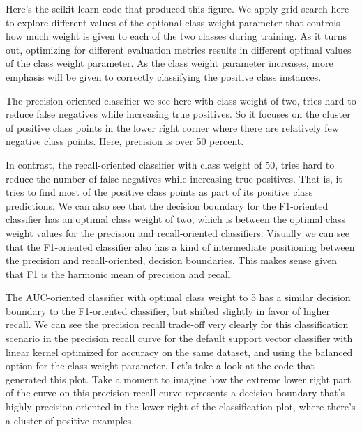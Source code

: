 \begin{multicols}{2}
Here's the scikit-learn code that produced this figure. We apply grid search here to explore different values of the optional class weight parameter that controls how much weight is given to each of the two classes during training. As it turns out, optimizing for different evaluation metrics results in different optimal values of the class weight parameter. As the class weight parameter increases, more emphasis will be given to correctly classifying the positive class instances. 


The precision-oriented classifier we see here with class weight of two, tries hard to reduce false negatives while increasing true positives. So it focuses on the cluster of positive class points in the lower right corner where there are relatively few negative class points. Here, precision is over 50 percent. 

In contrast, the recall-oriented classifier with class weight of 50, tries hard to reduce the number of false negatives while increasing true positives. That is, it tries to find most of the positive class points as part of its positive class predictions. We can also see that the decision boundary for the F1-oriented classifier has an optimal class weight of two, which is between the optimal class weight values for the precision and recall-oriented classifiers. Visually we can see that the F1-oriented classifier also has a kind of intermediate positioning between the precision and recall-oriented, decision boundaries. This makes sense given that F1 is the harmonic mean of precision and recall. 

The AUC-oriented classifier with optimal class weight to 5 has a similar decision boundary to the F1-oriented classifier, but shifted slightly in favor of higher recall. We can see the precision recall trade-off very clearly for this classification scenario in the precision recall curve for the default support vector classifier with linear kernel optimized for accuracy on the same dataset, and using the balanced option for the class weight parameter. Let's take a look at the code that generated this plot. Take a moment to imagine how the extreme lower right part of the curve on this precision recall curve represents a decision boundary that's highly precision-oriented in the lower right of the classification plot, where there's a cluster of positive examples. 


\end{multicols}
